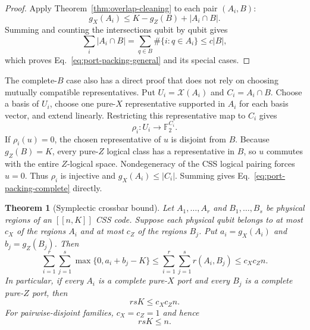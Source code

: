 \documentclass[aps,prx,reprint,superscriptaddress,nofootinbib,floatfix,longbibliography]{revtex4-2}
\newtheorem{theorem}{Theorem}[section]
\theoremstyle{definition}
\begin{document}
\begin{proof}
Apply Theorem~\ref{thm:overlap-cleaning} to each pair $(A_i,B)$:
\begin{equation*}
 g_X(A_i)\le K-g_Z(B)+|A_i\cap B|.
\end{equation*}
Summing and counting the intersections qubit by qubit gives
\begin{equation*}
 \sum_i |A_i\cap B|
 =\sum_{q\in B}\#\{i:q\in A_i\}\le c|B|,
\end{equation*}
which proves Eq.~\eqref{eq:port-packing-general} and its special cases.
\end{proof}

The complete-$B$ case also has a direct proof that does not rely on choosing mutually compatible representatives.  Put $U_i=\mathcal X(A_i)$ and $C_i=A_i\cap B$.  Choose a basis of $U_i$, choose one pure-$X$ representative supported in $A_i$ for each basis vector, and extend linearly.  Restricting this representative map to $C_i$ gives
\begin{equation*}
 \rho_i:U_i\longrightarrow \mathbb F_2^{C_i}.
\end{equation*}
If $\rho_i(u)=0$, the chosen representative of $u$ is disjoint from $B$.  Because $g_Z(B)=K$, every pure-$Z$ logical class has a representative in $B$, so $u$ commutes with the entire $Z$-logical space.  Nondegeneracy of the CSS logical pairing forces $u=0$.  Thus $\rho_i$ is injective and $g_X(A_i)\le |C_i|$.  Summing gives Eq.~\eqref{eq:port-packing-complete} directly.

\begin{theorem}[Symplectic crossbar bound]
\label{thm:symplectic-crossbar}
Let $A_1,\ldots,A_r$ and $B_1,\ldots,B_s$ be physical regions of an
$[[n,K]]$ CSS code.  Suppose each physical qubit belongs to at most $c_X$ of
the regions $A_i$ and at most $c_Z$ of the regions $B_j$.  Put
$a_i=g_X(A_i)$ and $b_j=g_Z(B_j)$.  Then
\begin{equation}
 \sum_{i=1}^r\sum_{j=1}^s
 \max\{0,a_i+b_j-K\}
 \le \sum_{i=1}^r\sum_{j=1}^s r(A_i,B_j)
 \le c_Xc_Z n .
 \label{eq:crossbar-general}
\end{equation}
In particular, if every $A_i$ is a complete pure-$X$ port and every $B_j$
is a complete pure-$Z$ port, then
\begin{equation}
 rsK\le c_Xc_Z n.
 \label{eq:crossbar-complete}
\end{equation}
For pairwise-disjoint families, $c_X=c_Z=1$ and hence
\begin{equation}
 rsK\le n.
 \label{eq:crossbar-disjoint}
\end{equation}
\end{theorem}
\end{document}
